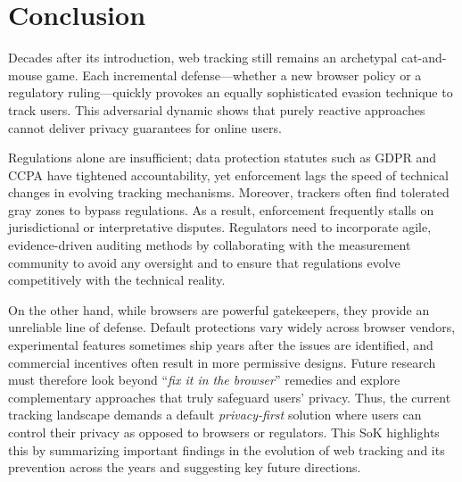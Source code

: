 \section{Conclusion}

Decades after its introduction, web tracking still remains an archetypal cat-and-mouse game.
%
Each incremental defense---whether a new browser policy or a regulatory ruling---quickly provokes an equally sophisticated evasion technique to track users.
%
%
This adversarial dynamic shows that purely reactive approaches cannot deliver privacy guarantees for online users.

Regulations alone are insufficient; data protection statutes such as GDPR and CCPA have tightened accountability, yet enforcement lags the speed of technical changes in evolving tracking mechanisms.
%
Moreover, trackers often find tolerated gray zones to bypass regulations.
%
As a result, enforcement frequently stalls on jurisdictional or interpretative disputes. 
%
Regulators need to incorporate agile, evidence-driven auditing methods by collaborating with the measurement community to avoid any oversight and to ensure that regulations evolve competitively with the technical reality.

On the other hand, while browsers are powerful gatekeepers, they provide an unreliable line of defense.
%
Default protections vary widely across browser vendors, experimental features sometimes ship years after the issues are identified, and commercial incentives often result in more permissive designs. 
%
Future research must therefore look beyond ``\textit{fix it in the browser}'' remedies and explore complementary approaches that truly safeguard users' privacy.
%
Thus, the current tracking landscape demands a default \textit{privacy-first} solution where users can control their privacy as opposed to browsers or regulators.
%
This SoK highlights this by summarizing important findings in the evolution of web tracking and its prevention across the years and suggesting key future directions.

